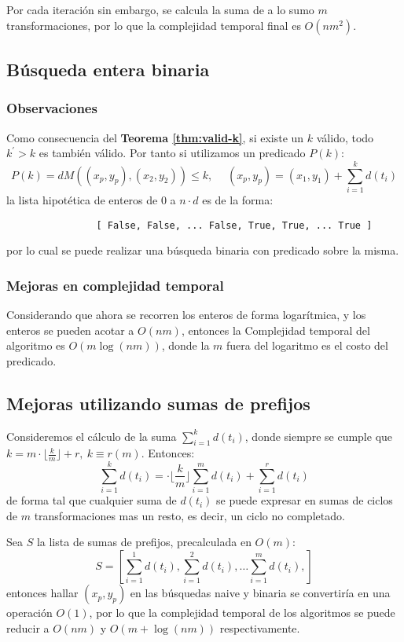 \documentclass{article}
\theoremstyle{default}
\begin{document}
		Por cada iteración sin embargo, se calcula la suma de a lo sumo $m$ transformaciones, por lo que la complejidad temporal final es $O(nm^2)$.
%
%
\subsection{Búsqueda entera binaria}
	\subsubsection{Observaciones}
		Como consecuencia del \textbf{Teorema \ref{thm:valid-k}}, si existe un $k$ válido, todo $k^\prime > k$ es también válido. Por tanto si utilizamos un predicado $P(k)$:
		\begin{equation*}
			P(k) = dM((x_p,y_p), (x_2,y_2)) \leq k, \quad\; (x_p,y_p) = (x_1,y_1) + \sum\limits_{i=1}^{k}{d(t_i)}
		\end{equation*}
		la lista hipotética de enteros de $0$ a $n \cdot d$ es de la forma:
		\begin{verbatim}
		        [ False, False, ... False, True, True, ... True ]
		\end{verbatim}
		por lo cual se puede realizar una búsqueda binaria con predicado sobre la misma.
%
	\subsubsection{Mejoras en complejidad temporal}
		Considerando que ahora se recorren los enteros de forma logarítmica, y los enteros se pueden acotar a $O(nm)$, entonces la Complejidad temporal del algoritmo es $O(m\log(nm))$, donde la $m$ fuera del logaritmo es el costo del predicado.
%
%
\subsection{Mejoras utilizando sumas de prefijos}
	Consideremos el cálculo de la suma $\sum\limits_{i=1}^{k}{d(t_i)}$, donde siempre se cumple que $k = m\cdot\Big\lfloor\frac{k}{m}\Big\rfloor + r,\ k \equiv r(m)$. Entonces:
	\begin{equation*}
		\sum\limits_{i=1}^{k}{d(t_i)} 
			= \cdot \Bigg\lfloor\frac{k}{m}\Bigg\rfloor\sum\limits_{i=1}^{m}{d(t_i)}
			+ \sum\limits_{i=1}^{r}{d(t_i)}
	\end{equation*}
	de forma tal que cualquier suma de $d(t_i)$ se puede expresar en sumas de ciclos de $m$ transformaciones mas un resto, es decir, un ciclo no completado.

	Sea $S$ la lista de sumas de prefijos, precalculada en $O(m)$:
	\begin{equation*}
		S = \left[
		\sum\limits_{i=1}^{1}{d(t_i)},
		\sum\limits_{i=1}^{2}{d(t_i)},
		\dots
		\sum\limits_{i=1}^{m}{d(t_i)},
	\right]
	\end{equation*}
	entonces hallar $(x_p,y_p)$ en las búsquedas naive y binaria se convertiría en una operación $O(1)$, por lo que la complejidad temporal de los algoritmos se puede reducir a $O(nm)$ y $O(m + \log(nm))$ respectivamente.
%
%
\end{document}
